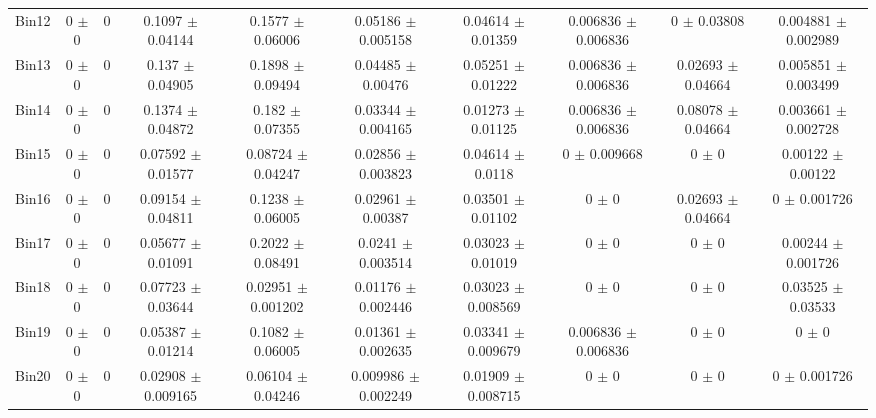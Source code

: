 \begin{tabular}{@{\extracolsep{4pt}}lccccccccc@{}}
     Bin12 & 0 $\pm$ 0 & 0 & 0.1097 $\pm$ 0.04144 & 0.1577 $\pm$ 0.06006 & 0.05186 $\pm$ 0.005158 & 0.04614 $\pm$ 0.01359 & 0.006836 $\pm$ 0.006836 & 0 $\pm$ 0.03808 & 0.004881 $\pm$ 0.002989 \\ 
     Bin13 & 0 $\pm$ 0 & 0 & 0.137 $\pm$ 0.04905 & 0.1898 $\pm$ 0.09494 & 0.04485 $\pm$ 0.00476 & 0.05251 $\pm$ 0.01222 & 0.006836 $\pm$ 0.006836 & 0.02693 $\pm$ 0.04664 & 0.005851 $\pm$ 0.003499 \\ 
     Bin14 & 0 $\pm$ 0 & 0 & 0.1374 $\pm$ 0.04872 & 0.182 $\pm$ 0.07355 & 0.03344 $\pm$ 0.004165 & 0.01273 $\pm$ 0.01125 & 0.006836 $\pm$ 0.006836 & 0.08078 $\pm$ 0.04664 & 0.003661 $\pm$ 0.002728 \\ 
     Bin15 & 0 $\pm$ 0 & 0 & 0.07592 $\pm$ 0.01577 & 0.08724 $\pm$ 0.04247 & 0.02856 $\pm$ 0.003823 & 0.04614 $\pm$ 0.0118 & 0 $\pm$ 0.009668 & 0 $\pm$ 0 & 0.00122 $\pm$ 0.00122 \\ 
     Bin16 & 0 $\pm$ 0 & 0 & 0.09154 $\pm$ 0.04811 & 0.1238 $\pm$ 0.06005 & 0.02961 $\pm$ 0.00387 & 0.03501 $\pm$ 0.01102 & 0 $\pm$ 0 & 0.02693 $\pm$ 0.04664 & 0 $\pm$ 0.001726 \\ 
     Bin17 & 0 $\pm$ 0 & 0 & 0.05677 $\pm$ 0.01091 & 0.2022 $\pm$ 0.08491 & 0.0241 $\pm$ 0.003514 & 0.03023 $\pm$ 0.01019 & 0 $\pm$ 0 & 0 $\pm$ 0 & 0.00244 $\pm$ 0.001726 \\ 
     Bin18 & 0 $\pm$ 0 & 0 & 0.07723 $\pm$ 0.03644 & 0.02951 $\pm$ 0.001202 & 0.01176 $\pm$ 0.002446 & 0.03023 $\pm$ 0.008569 & 0 $\pm$ 0 & 0 $\pm$ 0 & 0.03525 $\pm$ 0.03533 \\ 
     Bin19 & 0 $\pm$ 0 & 0 & 0.05387 $\pm$ 0.01214 & 0.1082 $\pm$ 0.06005 & 0.01361 $\pm$ 0.002635 & 0.03341 $\pm$ 0.009679 & 0.006836 $\pm$ 0.006836 & 0 $\pm$ 0 & 0 $\pm$ 0 \\ 
     Bin20 & 0 $\pm$ 0 & 0 & 0.02908 $\pm$ 0.009165 & 0.06104 $\pm$ 0.04246 & 0.009986 $\pm$ 0.002249 & 0.01909 $\pm$ 0.008715 & 0 $\pm$ 0 & 0 $\pm$ 0 & 0 $\pm$ 0.001726 \\ 
\hline\hline
  \end{tabular}
